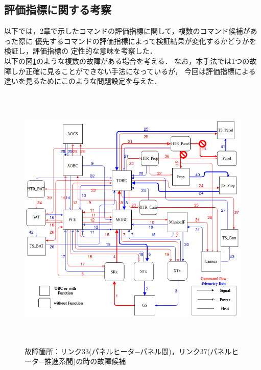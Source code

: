 \documentclass[11pt]{jsreport}
\begin{document}
\subsection{評価指標に関する考察}
以下では，2章で示したコマンドの評価指標に関して，複数のコマンド候補があった際に
優先するコマンドの評価指標によって検証結果が変化するかどうかを検証し，評価指標の
定性的な意味を考察した．\\
以下の図\ref{fig:fault_mode3}のような複数の故障がある場合を考える．
なお，本手法では1つの故障しか正確に見ることができない手法になっているが，
今回は評価指標による違いを見るためにこのような問題設定を与えた．
\begin{figure}[H]
   \centering
      \includegraphics[height=13.0cm]{figure/fault_mode3.png}
      \caption{故障箇所：リンク33(パネルヒータ−パネル間)，リンク37(パネルヒータ−推進系間)の時の故障候補}
      \label{fig:fault_mode3}
\end{figure}
\end{document}
